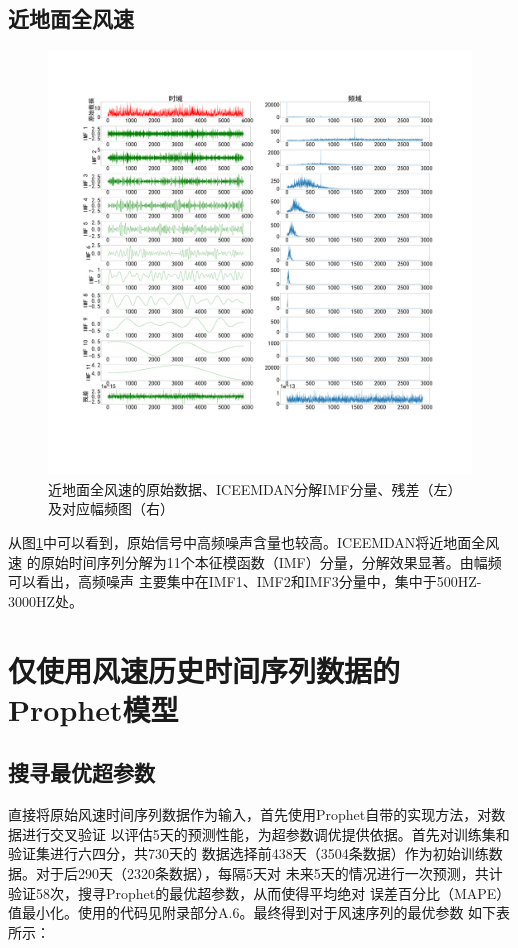 \documentclass[AutoFakeBold]{LZUThesis}
\begin{document}
\subsection{近地面全风速}
\begin{figure}[H]
	\centering
    \includegraphics[width=1\textwidth]{figures/wind.pdf}
    \caption{近地面全风速的原始数据、ICEEMDAN分解IMF分量、残差（左）及对应幅频图（右）}
    \label{fig_wind}
\end{figure}

从图\ref{fig_wind}中可以看到，原始信号中高频噪声含量也较高。ICEEMDAN将近地面全风速
的原始时间序列分解为11个本征模函数（IMF）分量，分解效果显著。由幅频可以看出，高频噪声
主要集中在IMF1、IMF2和IMF3分量中，集中于500HZ-3000HZ处。

\section{仅使用风速历史时间序列数据的Prophet模型}
\subsection{搜寻最优超参数}
直接将原始风速时间序列数据作为输入，首先使用Prophet自带的实现方法，对数据进行交叉验证
以评估5天的预测性能，为超参数调优提供依据。首先对训练集和验证集进行六四分，共730天的
数据选择前438天（3504条数据）作为初始训练数据。对于后290天（2320条数据），每隔5天对
未来5天的情况进行一次预测，共计验证58次，搜寻Prophet的最优超参数，从而使得平均绝对
误差百分比（MAPE）值最小化。使用的代码见附录部分A.6。最终得到对于风速序列的最优参数
如下表所示：
\end{document}

